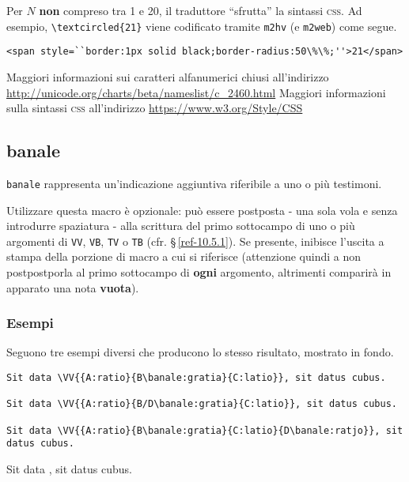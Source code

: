 \noindent Per $N$ \textbf{non} compreso tra 1 e 20, il traduttore ``sfrutta'' la sintassi \textsc{css}. Ad esempio, \verb"\textcircled{21}" viene codificato tramite \verb"m2hv" (e \verb"m2web") come segue.

\begin{center}
\footnotesize
\verb"<span style=``border:1px solid black;border-radius:50\%\%;''>21</span>"\index{\bs{}}
\end{center}

\noindent Maggiori informazioni sui caratteri alfanumerici chiusi all'indirizzo \url{http://unicode.org/charts/beta/nameslist/c_2460.html}
\noindent Maggiori informazioni sulla sintassi \textsc{css} all'indirizzo \url{https://www.w3.org/Style/CSS}

\subsection{banale}
\label{ref-12.1.3}

\verb"banale" rappresenta un'indicazione aggiuntiva riferibile a uno o pi{\`u} testimoni.

Utilizzare questa macro {\`e} opzionale: pu{\`o} essere postposta - una sola vola e senza introdurre spaziatura - alla scrittura del primo sottocampo di uno o pi{\`u} argomenti di \verb"VV", \verb"VB", \verb"TV" o \verb"TB" (cfr. \S\,\ref{ref-10.5.1}). Se presente, inibisce l'uscita a stampa della porzione di macro a cui si riferisce (attenzione quindi a non postpostporla al primo sottocampo di \textbf{ogni} argomento, altrimenti comparir{\`a} in apparato una nota \textbf{vuota}).

\subsubsection{Esempi}
Seguono tre esempi diversi che producono lo stesso risultato, mostrato in fondo.

{\footnotesize
\begin{verbatim}
Sit data \VV{{A:ratio}{B\banale:gratia}{C:latio}}, sit datus cubus.

Sit data \VV{{A:ratio}{B/D\banale:gratia}{C:latio}}, sit datus cubus.

Sit data \VV{{A:ratio}{B\banale:gratia}{C:latio}{D\banale:ratjo}}, sit datus cubus.
\end{verbatim}
}
\begin{maurotex}
Sit data , sit datus cubus.
\end{maurotex}

